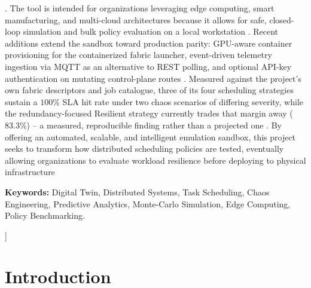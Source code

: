\documentclass[twoside,twocolumn,10pt]{article}
\begin{document}
\begin{@twocolumnfalse}
. The tool is intended for organizations leveraging edge computing, smart manufacturing, and multi-cloud architectures because it allows for safe, closed-loop simulation and bulk policy evaluation on a local workstation
. Recent additions extend the sandbox toward production parity: GPU-aware container provisioning for the containerized fabric launcher, event-driven telemetry ingestion via MQTT as an alternative to REST polling, and optional API-key authentication on mutating control-plane routes
. Measured against the project's own fabric descriptors and job catalogue, three of its four scheduling strategies sustain a $100\%$ SLA hit rate under two chaos scenarios of differing severity, while the redundancy-focused Resilient strategy currently trades that margin away ($83.3\%$) -- a measured, reproducible finding rather than a projected one
. By offering an automated, scalable, and intelligent emulation sandbox, this project seeks to transform how distributed scheduling policies are tested, eventually allowing organizations to evaluate workload resilience before deploying to physical infrastructure

\vspace{0.3cm}
\noindent\textbf{Keywords:}
Digital Twin, Distributed Systems, Task Scheduling, Chaos Engineering, Predictive Analytics, Monte-Carlo Simulation, Edge Computing, Policy Benchmarking.

\vspace{0.8cm}
\end{@twocolumnfalse}
]

\section{Introduction} \fontsize{11}{13}\selectfont
\end{document}
